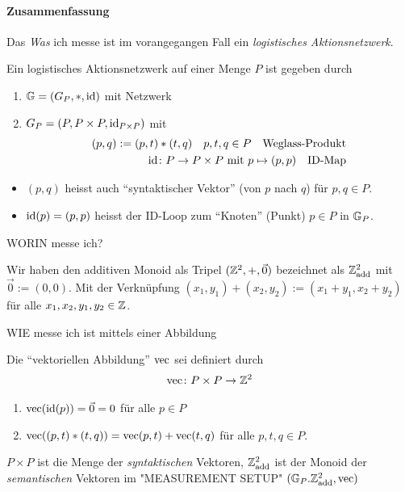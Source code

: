 \paragraph{Zusammenfassung}
Das \emph{Was} ich messe ist im vorangegangen Fall ein \emph{logistisches Aktionsnetzwerk}.
\begin{definition}
Ein logistisches Aktionsnetzwerk auf einer Menge $P$ ist gegeben durch
    \begin{enumerate}
        \item $\mathbb{G} = (G_P, \ast, \operatorname{id})$ mit Netzwerk
        \item $G_P = (P, P\times P, \operatorname{id}_{P \times P})$ mit
        \begin{align*}
            (p,q) := (p,t) \ast (t,q) \quad p,t,q \in P\quad \text{Weglass-Produkt}\\
            \operatorname{id} \colon P \to P \times P \text{ mit } p \mapsto (p,p) \quad \text{ID-Map}
        \end{align*}
    \end{enumerate}
\end{definition}
\begin{remark}
    \begin{itemize}
        \item $(p,q)$ heisst auch ``syntaktischer Vektor'' (von $p$ nach $q$) für $p,q \in P$.
        \item $\operatorname{id}(p) = (p,p)$ heisst der ID-Loop zum ``Knoten'' (Punkt) $p \in P$ in $\mathbb{G}_P$.
    \end{itemize}
\end{remark}

WORIN messe ich?

\begin{definition}
    Wir haben den additiven Monoid als Tripel $(\mathbb{Z}^2, +, \Vec{0})$ bezeichnet als $\mathbb{Z}^2_{\operatorname{add}}$ mit $\Vec{0} := (0,0)$. Mit der Verknüpfung $(x_1,y_1)+(x_2,y_2):= (x_1+y_1,x_2+y_2)$ für alle $x_1,x_2,y_1,y_2 \in \mathbb{Z}$.
\end{definition}
WIE messe ich ist mittels einer Abbildung
\begin{definition}
    Die ``vektoriellen Abbildung'' $\operatorname{vec}$ sei definiert durch
    \begin{align*}
        \operatorname{vec} \colon P \times P \to \mathbb{Z}^2
    \end{align*}
    \begin{enumerate}
        \item $\operatorname{vec}(\operatorname{id}(p)) = \vec{0} = 0$ für alle $p \in P$
        \item $\operatorname{vec}((p,t)\ast (t,q)) = \operatorname{vec}(p,t) + \operatorname{vec}(t,q)$ für alle $p,t,q \in P$.
    \end{enumerate}
\end{definition}
\begin{remark}
    $P\times P$ ist die Menge der \emph{syntaktischen} Vektoren, $\mathbb{Z}^2_{\operatorname{add}}$ ist der Monoid der \emph{semantischen} Vektoren im "MEASUREMENT SETUP" $(\mathbb{G}_P. \mathbb{Z}^2_{\operatorname{add}}, \operatorname{vec})$
\end{remark}
